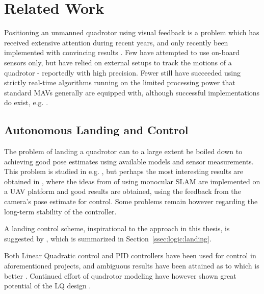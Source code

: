 \section{Related Work}
\label{sec:previouswork}

    Positioning an unmanned quadrotor using
    visual feedback is a problem which has received extensive attention
    during recent years, and only recently been implemented with convincing
    results \citep{DBLP:conf/icra/BloschWSS10,weiss11monocular}.
    Few have attempted to use on-board sensors only, but have relied on
    external setups to track the motions of a quadrotor - reportedly with high precision.
    Fewer still have succeeded using strictly real-time algorithms
    running on the limited processing power that standard
    MAVs generally are equipped with, although successful implementations do exist, e.g. \citep{Rudol10}.

    \subsection{Autonomous Landing and Control}
    The problem of landing a quadrotor can to a large extent be boiled
    down to achieving good pose estimates using available models and sensor measurements.
    This problem is studied in e.g. \citep{mellinger10perching,brockers:803111},
    but perhaps the most interesting results are obtained in \citep{DBLP:conf/icra/BloschWSS10,weiss11monocular},
    where the ideas from \citep{klein07parallel} of using monocular SLAM
    are implemented on a UAV platform and good results are obtained,
    using the feedback from the camera's pose estimate for control.
    Some problems remain however regarding the long-term stability of the controller.

    A landing control scheme, inspirational to the approach in this thesis,
    is suggested by \citep{brockers:803111}, which is summarized in Section~\ref{ssec:logic:landing}.

    Both Linear Quadratic control and PID controllers have been used for control
    in aforementioned projects, and ambiguous results have been attained
    as to which is better \citep{bouabdallah04pid}. Continued effort of
    quadrotor modeling have however shown great potential of the LQ design \citep{bouabdallah07full}.

